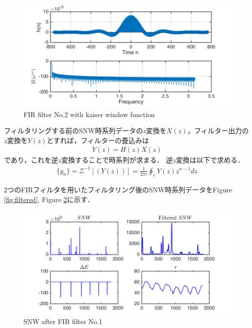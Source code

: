 \documentclass[twocolumn,oneside,a4paper]{article}
\begin{document}
\begin{figure}[htbp]
    \includegraphics[bb=0 0 432 216,width=1\columnwidth]{impulse1521.pdf}
    \caption{FIR filter No.2 with kaiser window function}
   \label{eq:fir_window2}
\end{figure}

フィルタリングする前のSNW時系列データの$z$変換を$X(z)$，フィルター出力の$z$変換を$Y(z)$とすれば，フィルターの畳込みは
\begin{eqnarray*}
	Y(z) = H(z) X(z)
\end{eqnarray*}
であり，これを逆$z$変換することで時系列が求まる．
逆$z$変換は以下で求める．
\begin{eqnarray*}
	\{y_n\} = \mathcal{Z}^{-1}[(Y(z))] = \frac{1}{2 \pi i} \oint_c Y(z) z^{n-1} dz
\end{eqnarray*}

2つのFIRフィルタを用いたフィルタリング後のSNW時系列データをFigure \ref{fig:filtered}, Figure \ref{fig:filtered2}に示す．

\begin{figure}[htbp]
    \includegraphics[bb=0 0 432 216,width=1\columnwidth]{snw_filtered.pdf}
    \caption{SNW after FIR filter No.1}
   \label{fig:filtered2}
\end{figure}
\end{document}
